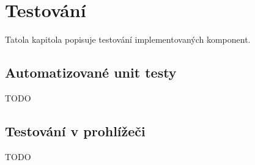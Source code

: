 \chapter{Testování}

Tatola kapitola popisuje testování implementovaných komponent.

\section{Automatizované unit testy}

TODO

\section{Testování v prohlížeči}

TODO

